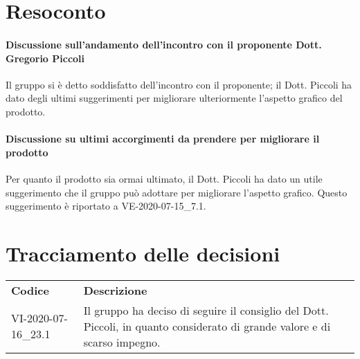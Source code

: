 \documentclass{article}
\begin{document}
\section{Resoconto}%
\label{resoconto}
\paragraph*{Discussione sull'andamento dell'incontro con il proponente Dott. Gregorio Piccoli}
Il gruppo si è detto soddisfatto dell'incontro con il proponente; il Dott. Piccoli ha dato degli ultimi suggerimenti per migliorare ulteriormente l'aspetto grafico 
del prodotto.

\paragraph*{Discussione su ultimi accorgimenti da prendere per migliorare il prodotto}
Per quanto il prodotto sia ormai ultimato, il Dott. Piccoli ha dato un utile suggerimento che il gruppo può adottare per migliorare l'aspetto grafico. Questo 
suggerimento è riportato a VE-2020-07-15\_7.1.

\section{Tracciamento delle decisioni}
\begin{table}[H]
  \centering
  \begin{tabular}{p{4cm}|p{12cm}}
    \rowcolor{lightgray}
    \textbf{Codice}  & \textbf{Descrizione}      \\
    VI-2020-07-16\_23.1 & Il gruppo ha deciso di seguire il consiglio del Dott. Piccoli, in quanto considerato di grande valore e di scarso impegno. \\
  \end{tabular}
\end{table}
\end{document}
